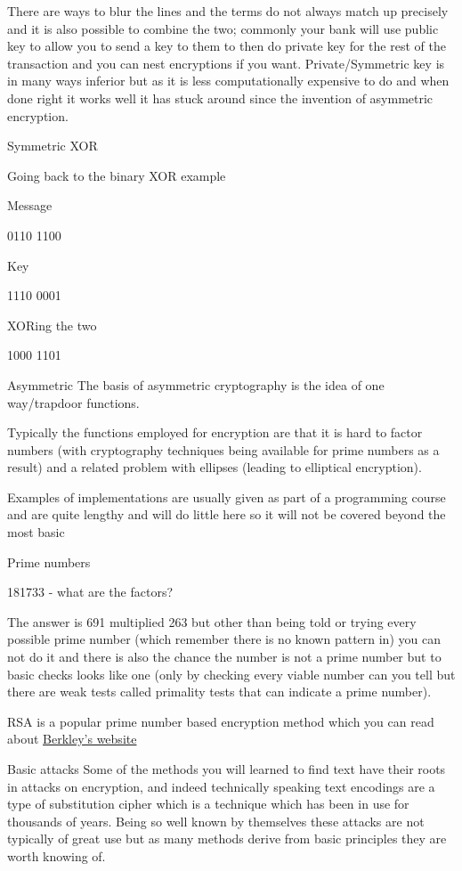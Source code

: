 \documentclass[
]{book}
\begin{document}
There are ways to blur the lines and the terms do not always match up precisely and it is also possible to combine the two; commonly your bank will use public key to allow you to send a key to them to then do private key for the rest of the transaction and you can nest encryptions if you want. Private/Symmetric key is in many ways inferior but as it is less computationally expensive to do and when done right it works well it has stuck around since the invention of asymmetric encryption.

Symmetric XOR

Going back to the binary XOR example

Message

0110 1100

Key

1110 0001

XORing the two

1000 1101

Asymmetric The basis of asymmetric cryptography is the idea of one way/trapdoor functions.

Typically the functions employed for encryption are that it is hard to factor numbers (with cryptography techniques being available for prime numbers as a result) and a related problem with ellipses (leading to elliptical encryption).

Examples of implementations are usually given as part of a programming course and are quite lengthy and will do little here so it will not be covered beyond the most basic

Prime numbers

181733 - what are the factors?

The answer is 691 multiplied 263 but other than being told or trying every possible prime number (which remember there is no known pattern in) you can not do it and there is also the chance the number is not a prime number but to basic checks looks like one (only by checking every viable number can you tell but there are weak tests called primality tests that can indicate a prime number).

RSA is a popular prime number based encryption method which you can read about \href{http://mathcircle.berkeley.edu/BMC3/rsa/node4.html}{Berkley's website}

Basic attacks Some of the methods you will learned to find text have their roots in attacks on encryption, and indeed technically speaking text encodings are a type of substitution cipher which is a technique which has been in use for thousands of years. Being so well known by themselves these attacks are not typically of great use but as many methods derive from basic principles they are worth knowing of.
\end{document}
